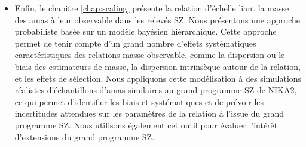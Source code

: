 \begin{itemize}[leftmargin=*]
\item
    Enfin, le chapitre \ref{chap:scaling} présente la relation d'échelle liant la masse des amas à leur observable dans les relevés SZ.
    Nous présentons une approche probabiliste basée sur un modèle bayésien hiérarchique.
    Cette approche permet de tenir compte d'un grand nombre d'effets systématiques caractéristiques des relations masse-observable, comme la dispersion ou le biais des estimateurs de masse, la dispersion intrinsèque autour de la relation, et les effets de sélection.
    Nous appliquons cette modélisation à des simulations réalistes d'échantillons d'amas similaires au grand programme SZ de NIKA2, ce qui permet d'identifier les biais et systématiques et de prévoir les incertitudes attendues sur les paramètres de la relation à l'issue du grand programme SZ.
    Nous utilisons également cet outil pour évaluer l'intérêt d'extensions du grand programme SZ.
\end{itemize}
